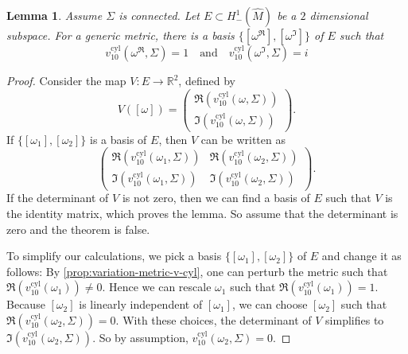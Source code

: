 \documentclass[preprint,12pt]{elsarticle}
\numberwithin{table}{section}
\newtheorem{lemma}{Lemma}[section]
\newcommand{\R}{\mathbb{R}}
\begin{document}
\begin{lemma}
	\label{lem:proof-assumptions-connected-case}
	Assume $\Sigma$ is connected.
	Let $E \subset H^1_-(\hat{M})$ be a $2$ dimensional subspace. For a generic metric, there is a basis $\{ [\omega^\Re], [\omega^\Im]\}$ of $E$ such that 
	$$
	v^{\mathrm{cyl}}_{10}(\omega^\Re, \Sigma) = 1
	\quad \text{and} \quad
	v^{\mathrm{cyl}}_{10}(\omega^\Im, \Sigma) = i
	$$
\end{lemma}
\begin{proof}
	Consider the map $V \colon E \to \R^2$, defined by 
	$$
	V([\omega]) = \begin{pmatrix}
		\Re(v^{\mathrm{cyl}}_{10}(\omega, \Sigma))\\ \Im(v^{\mathrm{cyl}}_{10}(\omega, \Sigma))
	\end{pmatrix}.$$
	If $\{[\omega_1], [\omega_2]\}$ is a basis of $E$, then $V$ can be written as
	$$
	\begin{pmatrix}
		\Re(v^{\mathrm{cyl}}_{10}(\omega_1, \Sigma)) & \Re(v^{\mathrm{cyl}}_{10}(\omega_2, \Sigma)) \\ \Im(v^{\mathrm{cyl}}_{10}(\omega_1, \Sigma)) & \Im(v^{\mathrm{cyl}}_{10}(\omega_2, \Sigma))
	\end{pmatrix}.$$
	If the determinant of $V$ is not zero, then we can find a basis of $E$ such that $V$ is the identity matrix, which proves the lemma. So assume that the determinant is zero and the theorem is false.

	To simplify our calculations, we pick a basis $\{[\omega_1], [\omega_2]\}$ of $E$ and change it as follows:	By \cref{prop:variation-metric-v-cyl}, one can perturb the metric such that $\Re(v^{\mathrm{cyl}}_{10}(\omega_1)) \not = 0$. Hence we can rescale $\omega_1$ such that $\Re(v^{\mathrm{cyl}}_{10}(\omega_1)) = 1$. Because $[\omega_2]$ is linearly independent of $[\omega_1]$, we can choose $[\omega_2]$ such that $\Re(v^{\mathrm{cyl}}_{10}(\omega_2, \Sigma)) = 0$. With these choices, the determinant of $V$ simplifies to $\Im(v^{\mathrm{cyl}}_{10}(\omega_2, \Sigma))$. So by assumption, $v^{\mathrm{cyl}}_{10}(\omega_2, \Sigma) = 0$.
	

\end{proof}
\end{document}
